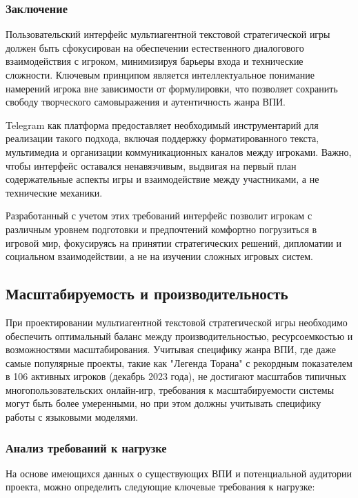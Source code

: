\subsubsection{Заключение}

Пользовательский интерфейс мультиагентной текстовой стратегической игры должен быть сфокусирован на обеспечении естественного диалогового взаимодействия с игроком, минимизируя барьеры входа и технические сложности. Ключевым принципом является интеллектуальное понимание намерений игрока вне зависимости от формулировки, что позволяет сохранить свободу творческого самовыражения и аутентичность жанра ВПИ.

Telegram как платформа предоставляет необходимый инструментарий для реализации такого подхода, включая поддержку форматированного текста, мультимедиа и организации коммуникационных каналов между игроками. Важно, чтобы интерфейс оставался ненавязчивым, выдвигая на первый план содержательные аспекты игры и взаимодействие между участниками, а не технические механики.

Разработанный с учетом этих требований интерфейс позволит игрокам с различным уровнем подготовки и предпочтений комфортно погрузиться в игровой мир, фокусируясь на принятии стратегических решений, дипломатии и социальном взаимодействии, а не на изучении сложных игровых систем.

\subsection{Масштабируемость и производительность}

При проектировании мультиагентной текстовой стратегической игры необходимо обеспечить оптимальный баланс между производительностью, ресурсоемкостью и возможностями масштабирования. Учитывая специфику жанра ВПИ, где даже самые популярные проекты, такие как "Легенда Торана" с рекордным показателем в 106 активных игроков (декабрь 2023 года), не достигают масштабов типичных многопользовательских онлайн-игр, требования к масштабируемости системы могут быть более умеренными, но при этом должны учитывать специфику работы с языковыми моделями.

\subsubsection{Анализ требований к нагрузке}

На основе имеющихся данных о существующих ВПИ и потенциальной аудитории проекта, можно определить следующие ключевые требования к нагрузке:

